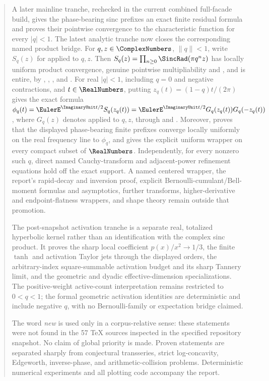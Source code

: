 \documentclass[11pt]{article}
\numberwithin{equation}{section}
\theoremstyle{definition}
\theoremstyle{remark}
\begin{document}
\begin{abstract}
A later mainline tranche, rechecked in the
current combined full-facade build, gives the phase-bearing sinc prefixes an exact finite
residual formula and proves their pointwise convergence to the characteristic function for
every \(|q|<1\).  The latest analytic tranche now closes the corresponding named product
bridge.  For \(q,z\in\ComplexNumbers\), \(\lVert q\rVert<1\), write \(S_q(z)\) for
 applied to \(q,z\).  Then
\(S_q(z)=\prod_{n\ge0}\SincRad(\pi q^nz)\) has locally uniform
product convergence, genuine pointwise multipliability and , and is entire, by
,
,
, and
.  For real \(|q|<1\), including \(q=0\) and
negative contractions, and \(t\in\RealNumbers\), putting \(z_q(t)=(1-q)t/(2\pi)\) gives the exact formula
\(\phi_q(t)=\EulerE^{\ImaginaryUnit t/2}S_q(z_q(t))=\EulerE^{\ImaginaryUnit t/2}G_q(z_q(t))G_q(-z_q(t))\), where
\(G_q(z)\) denotes  applied to \(q,z\), through
 and
.
Moreover,  proves that the displayed
phase-bearing finite prefixes converge locally uniformly on the real frequency line to
\(\phi_q\), and  gives the explicit uniform
wrapper on every compact subset of \(\RealNumbers\).  Independently, for every nonzero such \(q\),
direct named Cauchy-transform and adjacent-power refinement equations hold off the exact
support.  A named centered wrapper, the report's
rapid-decay and inversion proof, explicit Bernoulli-cumulant/Bell-moment formulas and
asymptotics, further transforms, higher-derivative and endpoint-flatness wrappers, and shape
theory remain outside that promotion.

The post-snapshot activation tranche is a separate real, totalized hyperbolic kernel rather
than an identification with the complex sinc product.  It proves the sharp local coefficient
\(p(x)/x^2\to1/3\), the finite \(\tanh\) and activation Taylor jets through the displayed
orders, the arbitrary-index square-summable activation budget and its sharp Tannery limit,
and the geometric and dyadic effective-dimension specializations.  The positive-weight
active-count interpretation remains restricted to \(0<q<1\); the formal geometric activation
identities are deterministic and include negative \(q\), with no Bernoulli-family or
expectation bridge claimed.

The word \emph{new} is used only in a corpus-relative sense: these statements were not found
in the 57 TeX sources inspected in the specified repository snapshot.  No claim of global
priority is made.  Proven statements are separated sharply from conjectural transseries,
strict log-concavity, Edgeworth, inverse-phase, and arithmetic-collision problems.
Deterministic numerical experiments and all plotting code accompany the report.
\end{abstract}
\end{document}
